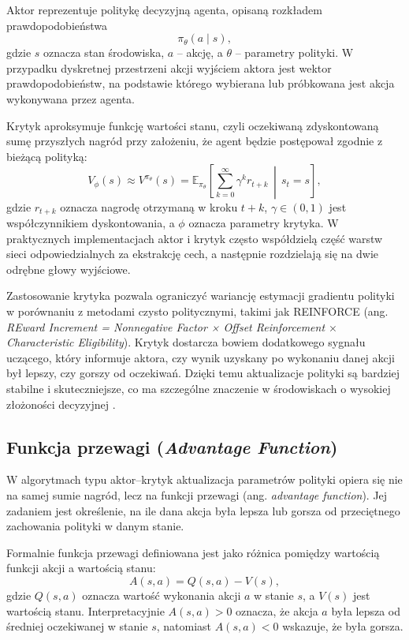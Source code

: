 Aktor reprezentuje politykę decyzyjną agenta, opisaną rozkładem prawdopodobieństwa
\[
\pi_\theta(a \mid s),
\]
gdzie $s$ oznacza stan środowiska, $a$ -- akcję, a $\theta$ -- parametry polityki.
W przypadku dyskretnej przestrzeni akcji wyjściem aktora jest wektor prawdopodobieństw,
na podstawie którego wybierana lub próbkowana jest akcja wykonywana przez agenta.

Krytyk aproksymuje funkcję wartości stanu, czyli oczekiwaną zdyskontowaną sumę przyszłych
nagród przy założeniu, że agent będzie postępował zgodnie z bieżącą polityką:
\[
V_\phi(s) \approx V^{\pi_\theta}(s)
= \mathbb{E}_{\pi_\theta}\!\left[
\sum_{k=0}^{\infty} \gamma^k r_{t+k}
\,\middle|\, s_t = s
\right],
\]
gdzie $r_{t+k}$ oznacza nagrodę otrzymaną w kroku $t+k$, $\gamma \in (0,1)$ jest współczynnikiem
dyskontowania, a $\phi$ oznacza parametry krytyka. W praktycznych implementacjach aktor i krytyk
często współdzielą część warstw sieci odpowiedzialnych za ekstrakcję cech, a następnie rozdzielają się
na dwie odrębne głowy wyjściowe.

Zastosowanie krytyka pozwala ograniczyć wariancję estymacji gradientu polityki w porównaniu
z metodami czysto politycznymi, takimi jak \textsc{REINFORCE} (ang.\textit{ REward Increment = Nonnegative Factor × Offset Reinforcement $\times$ Characteristic Eligibility}). Krytyk dostarcza bowiem
dodatkowego sygnału uczącego, który informuje aktora, czy wynik uzyskany po wykonaniu danej
akcji był lepszy, czy gorszy od oczekiwań. Dzięki temu aktualizacje polityki są bardziej stabilne
i skuteczniejsze, co ma szczególne znaczenie w środowiskach o wysokiej złożoności decyzyjnej
\cite{mnih2016}.

\subsection*{Funkcja przewagi (\textit{Advantage Function})}

W algorytmach typu aktor--krytyk aktualizacja parametrów polityki opiera się nie na samej
sumie nagród, lecz na funkcji przewagi (ang. \textit{advantage function}).
Jej zadaniem jest określenie, na ile dana akcja była lepsza lub gorsza od przeciętnego
zachowania polityki w danym stanie.

Formalnie funkcja przewagi definiowana jest jako różnica pomiędzy wartością funkcji akcji
a wartością stanu:
\[
A(s,a) = Q(s,a) - V(s),
\]
gdzie $Q(s,a)$ oznacza wartość wykonania akcji $a$ w stanie $s$, a $V(s)$ jest wartością stanu.
Interpretacyjnie $A(s,a) > 0$ oznacza, że akcja $a$ była lepsza od średniej oczekiwanej w stanie $s$,
natomiast $A(s,a) < 0$ wskazuje, że była gorsza.


